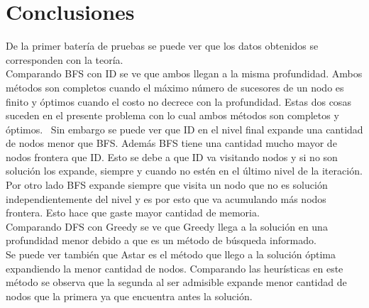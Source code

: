 \documentclass[10pt,journal,compsoc]{IEEEtran}
\begin{document}



\section{Conclusiones}

De la primer bater\'ia de pruebas se puede ver que los datos obtenidos se corresponden con la teor\'ia.\\
Comparando BFS con ID se ve que ambos llegan a la misma profundidad. Ambos m\'etodos son completos cuando el m\'aximo n\'umero de sucesores de un nodo es finito y \'optimos cuando el costo no decrece con la profundidad. Estas dos cosas suceden en el presente problema con lo cual ambos m\'etodos son completos y \'optimos. \ Sin embargo se puede ver que ID en el nivel final expande una cantidad de nodos menor que BFS. Adem\'as BFS tiene una cantidad mucho mayor de nodos frontera que ID. Esto se debe a que ID va visitando nodos y si no son soluci\'on los expande, siempre y cuando no est\'en en el \'ultimo nivel de la iteraci\'on. Por otro lado BFS expande siempre que visita un nodo que no es soluci\'on independientemente del nivel y es por esto que va acumulando m\'as nodos frontera. Esto hace que gaste mayor cantidad de memoria.\\
Comparando DFS con Greedy se ve que Greedy llega a la soluci\'on en una profundidad menor debido a que es un m\'etodo de b\'usqueda informado.\\
Se puede ver tambi\'en que Astar es el m\'etodo que llego a la soluci\'on \'optima expandiendo la menor cantidad de nodos. Comparando las heur\'isticas en este m\'etodo se observa que la segunda al ser admisible expande menor cantidad de nodos que la primera ya que encuentra antes la soluci\'on.\\
\end{document}
